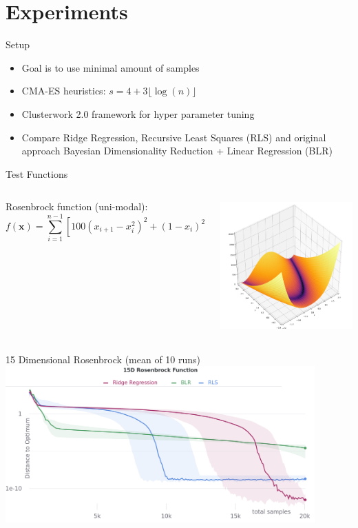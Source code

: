 \documentclass[navbarinfooter, 12pt]{sdqbeamer}
\begin{document}
\section{Experiments}
\begin{frame}{Setup}
\begin{itemize}
\item Goal is to use minimal amount of samples
\item CMA-ES heuristics: $s = 4 + 3 \lfloor \log(n) \rfloor$
\item Clusterwork 2.0 framework for hyper parameter tuning
\item Compare Ridge Regression, Recursive Least Squares (RLS)  and original approach Bayesian Dimensionality Reduction + Linear Regression (BLR)
\end{itemize}
\end{frame}


\begin{frame}{Test Functions}
\begin{columns}[c]
  \begin{column}{8cm}
    Rosenbrock function (uni-modal):
    $$ f(\mathbf{x}) = \sum^{n-1}_{i=1} [100 (x_{i+1} - x_i^2)^2 + (1 - x_i)^2] $$
  \end{column}
  \begin{column}{5cm}
    \includegraphics[height=5cm]{figures/Rosenbrock.png}
  \end{column}
\end{columns}
\end{frame}


\begin{frame}{15 Dimensional Rosenbrock (mean of 10 runs)}
  \centering
  \includegraphics[height=6cm]{figures/rosenbrock_results.png}
\end{frame}
\end{document}
